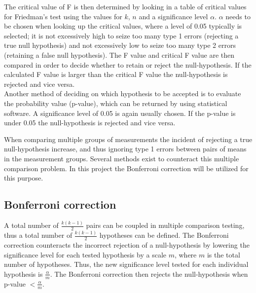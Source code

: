 The critical value of F is then determined by looking in a table of critical values for Friedman's test using the values for $k$, $n$ and a significance level $\alpha$. $\alpha$ needs to be chosen when looking up the critical values, where a level of 0.05 typically is selected; it is not excessively high to seize too many type 1 errors (rejecting a true null hypothesis) and not excessively low to seize too many type 2 errors (retaining a false null hypothesis). The F value and critical F value are then compared in order to decide whether to retain or reject the null-hypothesis. If the calculated F value is larger than the critical F value the null-hypothesis is rejected and vice versa. \cite{Zar2009} \\
Another method of deciding on which hypothesis to be accepted is to evaluate the probability value (p-value), which can be returned by using statistical software. A significance level of 0.05 is again usually chosen. If the p-value is under 0.05 the null-hypothesis is rejected and vice versa. \cite{Zar2009}

When comparing multiple groups of measurements the incident of rejecting a true null-hypothesis increase, and thus ignoring type 1 errors between pairs of means in the measurement groups.  Several methods exist to counteract this multiple comparison problem. In this project the Bonferroni correction will be utilized for this purpose.

\subsection{Bonferroni correction}
A total number of $\frac{k(k-1)}{2}$ pairs can be coupled in multiple comparison testing, thus a total number of $\frac{k(k-1)}{2}$ hypotheses can be defined. The Bonferroni correction counteracts the incorrect rejection of a null-hypothesis by lowering the significance level for each tested hypothesis by a scale $m$, where $m$ is the total number of hypotheses. Thus, the new significance level tested for each individual hypothesis is $\frac{\alpha}{m}$. The Bonferroni correction then rejects the null-hypothesis when p-value $< \frac{\alpha}{m}$. 



